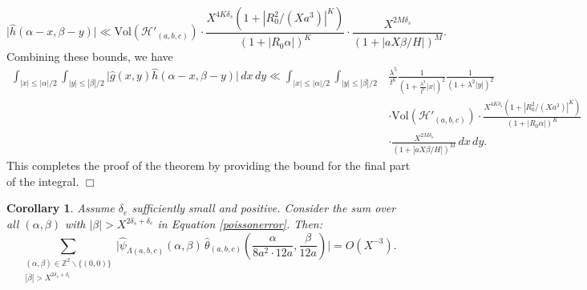 \documentclass{article}
\def\H{{\mathcal H}}
\def\H{{\mathcal H}}
\newtheorem{cor}[theorem]{Corollary}
\newenvironment{proof}{\noindent {\bf Proof:}}{$\Box$ \vspace{2 ex}}
\begin{document}
\begin{proof}
\begin{equation*}
\big|\widehat{h}(\alpha - x, \beta - y)\big| \ll \text{Vol}(\H'_{(a,b,c)}) \cdot \frac{X^{4K\delta_s}(1 + |R_0^2 / (X a^3)|^{K})}{ (1 + |R_0 \alpha|)^{K}} \cdot \frac{X^{2M\delta_s }}{ (1 + |a X \beta / H|)^{M}}.
\end{equation*}
Combining these bounds, we have
\begin{align*}
\int_{|x| \leq |\alpha|/2} \int_{|y| \leq |\beta|/2} \big|\widehat{g}(x, y) \widehat{h}(\alpha - x, \beta - y)\big| \, dx \, dy \ll \int_{|x| \leq |\alpha|/2} \int_{|y| \leq |\beta|/2} & \frac{\lambda^5}{t^6} \frac{1}{\left(1 + \frac{\lambda^3}{t^6} |x|\right)^{2}} \frac{1}{(1 + \lambda^2 |y|)^{2}} \\
& \cdot \text{Vol}(\H'_{(a,b,c)}) \cdot \frac{X^{4K\delta_s}(1 + |R_0^2 / (X a^3)|^{K})}{(1 + |R_0 \alpha|)^{K}} \\
& \cdot \frac{X^{2M\delta_s}}{ (1 + |a X \beta / H|)^{M}} \, dx \, dy.
\end{align*}
This completes the proof of the theorem by providing the bound for the final part of the integral.
\end{proof}
\begin{cor}\label{beta}
Assume $\delta_e$ sufficiently small and positive. Consider the sum over all $(\alpha, \beta)$ with $|\beta| > X^{2\delta_s + \delta_e}$ in Equation \eqref{poissonerror}. Then:
\begin{equation*}
    \sum_{\substack{(\alpha, \beta) \in \mathbb{Z}^2 \backslash \{(0, 0)\} \\ |\beta| > X^{2\delta_s + \delta_e}}} \Big| \widehat{\psi}_{\Lambda(a, b, c)}(\alpha, \beta) \, \widehat{\theta}_{(a, b, c)}\left(\frac{\alpha}{8a^2 \cdot 12a}, \frac{\beta}{12a}\right) \Big| = O(X^{-3}).
\end{equation*}    
\end{cor}
\end{document}
